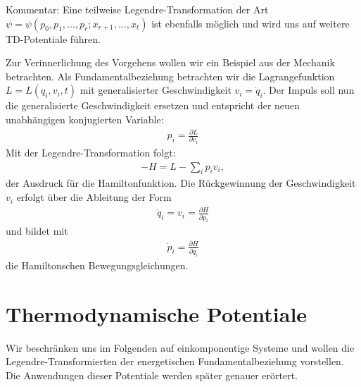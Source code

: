 Kommentar: Eine teilweise Legendre-Transformation der Art $\psi=\psi(p_0,p_1,...,p_r;x_{r+1},...,x_t)$ ist ebenfalls möglich und wird uns auf weitere TD-Potentiale führen.

Zur Verinnerlichung des Vorgehens wollen wir ein Beispiel aus der Mechanik betrachten.
Als Fundamentalbeziehung betrachten wir die Lagrangefunktion $L=L(q_i,v_i,t)$ mit generalisierter Geschwindigkeit $v_i=\dot{q}_i$.
Der Impuls soll nun die generalisierte Geschwindigkeit ersetzen und entspricht der neuen unabhängigen konjugierten Variable:
\begin{align*}
    p_i=\frac{\partial L}{\partial v_i}
\end{align*}
Mit der Legendre-Transformation folgt:
\begin{align*}
    \boxed{-H=L-\sum_i p_iv_i},
\end{align*}
der Ausdruck für die Hamiltonfunktion.
Die Rückgewinnung der Geschwindigkeit $v_i$ erfolgt über die Ableitung der Form
\begin{align*}
    \dot{q}_i=v_i=\frac{\partial H}{\partial p_i}
\end{align*}
und bildet mit 
\begin{align*}
    \dot{p}_i=\frac{\partial H}{\partial q_i}
\end{align*}
die Hamiltonschen Bewegungsgleichungen.

\section{Thermodynamische Potentiale}
Wir beschränken uns im Folgenden auf einkomponentige Systeme und wollen die Legendre-Transformierten der energetischen Fundamentalbeziehung vorstellen. Die Anwendungen dieser Potentiale werden später genauer erörtert.

